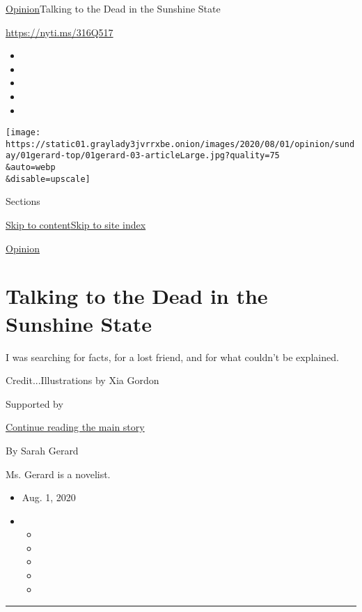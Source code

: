 \href{/section/opinion}{Opinion}\textbar{}Talking to the Dead in the
Sunshine State

\url{https://nyti.ms/316Q517}

\begin{itemize}
\item
\item
\item
\item
\item
\end{itemize}

\texttt{[image: https://static01.graylady3jvrrxbe.onion/images/2020/08/01/opinion/sunday/01gerard-top/01gerard-03-articleLarge.jpg?quality=75\\\&auto=webp\\\&disable=upscale]}

Sections

\protect\hyperlink{site-content}{Skip to
content}\protect\hyperlink{site-index}{Skip to site index}

\href{/section/opinion}{Opinion}

\hypertarget{talking-to-the-dead-in-the-sunshine-state}{%
\section{Talking to the Dead in the Sunshine
State}\label{talking-to-the-dead-in-the-sunshine-state}}

I was searching for facts, for a lost friend, and for what couldn't be
explained.

Credit...Illustrations by Xia Gordon

Supported by

\protect\hyperlink{after-sponsor}{Continue reading the main story}

By Sarah Gerard

Ms. Gerard is a novelist.

\begin{itemize}
\item
  Aug. 1, 2020
\item
  \begin{itemize}
  \item
  \item
  \item
  \item
  \item
  \end{itemize}
\end{itemize}

\begin{center}\rule{0.5\linewidth}{\linethickness}\end{center}

